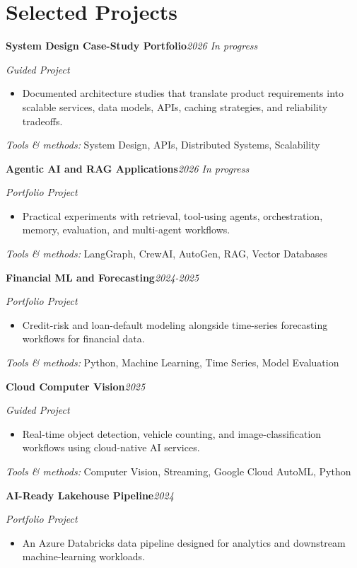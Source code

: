 \documentclass[9pt,letterpaper]{extarticle}
\newcommand{\entry}[2]{\Needspace{4\baselineskip}\textbf{#1}\hfill\textit{#2}\par}
\begin{document}
\section{Selected Projects}
\entry{System Design Case-Study Portfolio}{2026 \textbar{} In progress}
\textit{Guided Project}\par
\begin{itemize}
\item Documented architecture studies that translate product requirements into scalable services, data models, APIs, caching strategies, and reliability tradeoffs.
\end{itemize}
{\small\textit{Tools \& methods:} System Design, APIs, Distributed Systems, Scalability\par}
\entry{Agentic AI and RAG Applications}{2026 \textbar{} In progress}
\textit{Portfolio Project}\par
\begin{itemize}
\item Practical experiments with retrieval, tool-using agents, orchestration, memory, evaluation, and multi-agent workflows.
\end{itemize}
{\small\textit{Tools \& methods:} LangGraph, CrewAI, AutoGen, RAG, Vector Databases\par}
\entry{Financial ML and Forecasting}{2024-2025}
\textit{Portfolio Project}\par
\begin{itemize}
\item Credit-risk and loan-default modeling alongside time-series forecasting workflows for financial data.
\end{itemize}
{\small\textit{Tools \& methods:} Python, Machine Learning, Time Series, Model Evaluation\par}
\entry{Cloud Computer Vision}{2025}
\textit{Guided Project}\par
\begin{itemize}
\item Real-time object detection, vehicle counting, and image-classification workflows using cloud-native AI services.
\end{itemize}
{\small\textit{Tools \& methods:} Computer Vision, Streaming, Google Cloud AutoML, Python\par}
\entry{AI-Ready Lakehouse Pipeline}{2024}
\textit{Portfolio Project}\par
\begin{itemize}
\item An Azure Databricks data pipeline designed for analytics and downstream machine-learning workloads.
\end{itemize}
\end{document}
